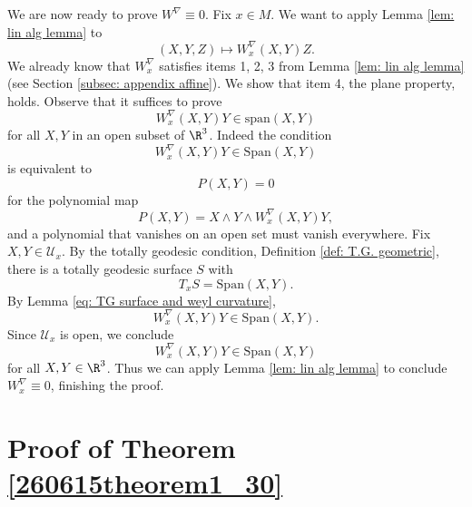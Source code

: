 \documentclass{article}
\numberwithin{equation}{section}
\theoremstyle{plain}
\begin{document}
    We are now ready to prove $W^\nabla \equiv 0$. Fix $x \in M$. We want to apply Lemma \ref{lem: lin alg lemma} to 
    \begin{equation}
    (X,Y,Z) \mapsto W_x^\nabla(X,Y)Z.
    \end{equation}
     We already know that $W_x^\nabla$ satisfies items 1, 2, 3 from Lemma \ref{lem: lin alg lemma} (see Section \ref{subsec: appendix affine}). We show that item 4, the plane property, holds. Observe that it suffices to prove 
     \begin{equation}
     W_x^\nabla(X,Y)Y \in \mathrm{span}(X,Y)
     \end{equation}
      for all $X,Y$ in an open subset of $\R^3$. Indeed the condition
      \begin{equation}
      W_x^\nabla(X,Y) Y \in \mathrm{Span}(X,Y)
      \end{equation}
       is equivalent to 
       \begin{equation}
       P(X,Y) = 0
       \end{equation}
        for the polynomial map 
       \begin{equation}
       P(X,Y) = X \wedge Y \wedge W_x^\nabla(X,Y)Y,
       \end{equation}
         and a polynomial that vanishes on an open set must vanish everywhere. Fix $X,Y \in \mathcal U_x$. By the totally geodesic condition, Definition \ref{def: T.G. geometric}, there is a totally geodesic surface $S$ with 
         \begin{equation}
         T_x S = \mathrm{Span}(X,Y).
         \end{equation}
          By Lemma \ref{eq: TG surface and weyl curvature}, 
          \begin{equation}
          W_x^\nabla(X,Y)Y \in \mathrm{Span}(X,Y).
          \end{equation}
           Since $\mathcal U_x$ is open, we conclude 
           \begin{equation}
           W_x^\nabla(X,Y)Y \in \mathrm{Span}(X,Y)
           \end{equation}
            for all $X,Y \in \R^3$. Thus we can apply Lemma \ref{lem: lin alg lemma} to conclude $W^\nabla_x \equiv 0$, finishing the proof. 
    








\section{Proof of Theorem \ref{260615theorem1_30}}
\end{document}
